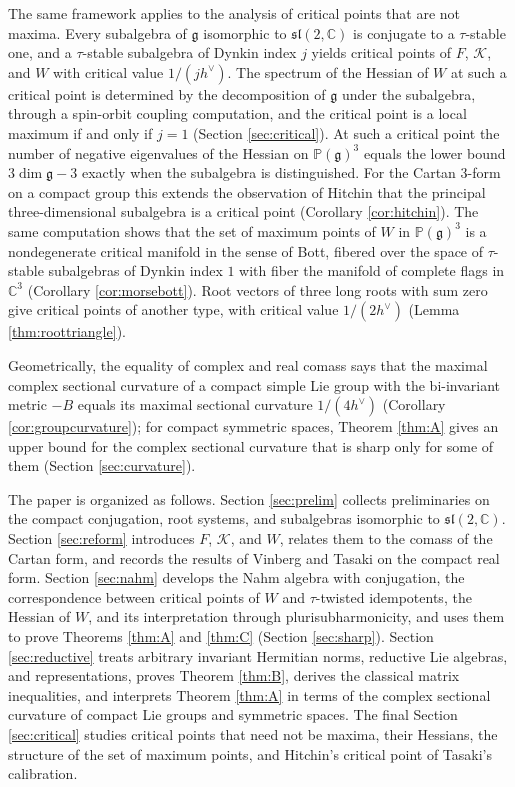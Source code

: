\documentclass [leqno, 10pt]{amsart}
\theoremstyle{definition}
\numberwithin{equation}{section}
\newcommand{\sect}{\mathscr{K}}
\newcommand{\sll}{\mathfrak{sl}}
\newcommand{\proj}{\mathbb{P}}
\newcommand{\g}{\mathfrak{g}}
\newcommand{\com}{\mathbb C}
\newcommand{\hv}{h^\vee}
\begin{document}
The same framework applies to the analysis of critical points that are not maxima. Every subalgebra of $\g$ isomorphic to $\sll(2, \com)$ is conjugate to a $\tau$-stable one, and a $\tau$-stable subalgebra of Dynkin index $j$ yields critical points of $F$, $\sect$, and $W$ with critical value $1/(j\hv)$. The spectrum of the Hessian of $W$ at such a critical point is determined by the decomposition of $\g$ under the subalgebra, through a spin-orbit coupling computation, and the critical point is a local maximum if and only if $j = 1$ (Section \ref{sec:critical}). At such a critical point the number of negative eigenvalues of the Hessian on $\proj(\g)^{3}$ equals the lower bound $3\dim\g - 3$ exactly when the subalgebra is distinguished. For the Cartan $3$-form on a compact group this extends the observation of Hitchin \cite{Hitchin-calibrations} that the principal three-dimensional subalgebra is a critical point (Corollary \ref{cor:hitchin}). The same computation shows that the set of maximum points of $W$ in $\proj(\g)^{3}$ is a nondegenerate critical manifold in the sense of Bott, fibered over the space of $\tau$-stable subalgebras of Dynkin index $1$ with fiber the manifold of complete flags in $\com^{3}$ (Corollary \ref{cor:morsebott}). Root vectors of three long roots with sum zero give critical points of another type, with critical value $1/(2\hv)$ (Lemma \ref{thm:roottriangle}).

Geometrically, the equality of complex and real comass says that the maximal complex sectional curvature of a compact simple Lie group with the bi-invariant metric $-B$ equals its maximal sectional curvature $1/(4\hv)$ (Corollary \ref{cor:groupcurvature}); for compact symmetric spaces, Theorem \ref{thm:A} gives an upper bound for the complex sectional curvature that is sharp only for some of them (Section \ref{sec:curvature}).

The paper is organized as follows. Section \ref{sec:prelim} collects preliminaries on the compact conjugation, root systems, and subalgebras isomorphic to $\sll(2, \com)$. Section \ref{sec:reform} introduces $F$, $\sect$, and $W$, relates them to the comass of the Cartan form, and records the results of Vinberg and Tasaki on the compact real form. Section \ref{sec:nahm} develops the Nahm algebra with conjugation, the correspondence between critical points of $W$ and $\tau$-twisted idempotents, the Hessian of $W$, and its interpretation through plurisubharmonicity, and uses them to prove Theorems \ref{thm:A} and \ref{thm:C} (Section \ref{sec:sharp}). Section \ref{sec:reductive} treats arbitrary invariant Hermitian norms, reductive Lie algebras, and representations, proves Theorem \ref{thm:B}, derives the classical matrix inequalities, and interprets Theorem \ref{thm:A} in terms of the complex sectional curvature of compact Lie groups and symmetric spaces. The final Section \ref{sec:critical} studies critical points that need not be maxima, their Hessians, the structure of the set of maximum points, and Hitchin's critical point of Tasaki's calibration.
\end{document}
